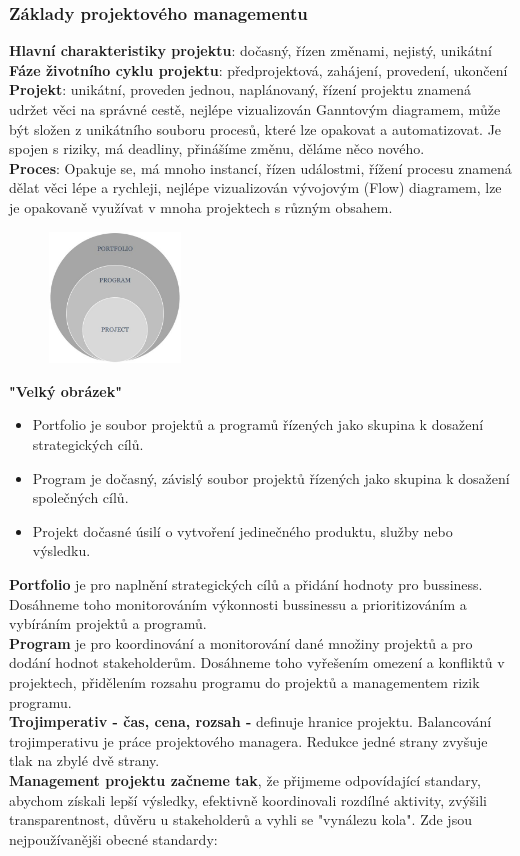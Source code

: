 \documentclass[11pt,a4paper]{article}
\begin{document}
    \subsubsection{Základy projektového managementu}
        \textbf{Hlavní charakteristiky projektu}: dočasný, řízen změnami, nejistý, unikátní\\
        \textbf{Fáze životního cyklu projektu}: předprojektová, zahájení, provedení, ukončení\\
        \textbf{Projekt}: unikátní, proveden jednou, naplánovaný, řízení projektu znamená udržet věci na správné cestě, nejlépe vizualizován Ganntovým diagramem, může být složen z unikátního souboru procesů, které lze opakovat a automatizovat. Je spojen s riziky, má deadliny, přinášíme změnu, děláme něco nového.\\
        \textbf{Proces}: Opakuje se, má mnoho instancí, řízen událostmi, řížení procesu znamená dělat věci lépe a rychleji, nejlépe vizualizován vývojovým (Flow) diagramem, lze je opakovaně využívat v mnoha projektech s různým obsahem.\\
        \begin{figure}
        \centering
        \includegraphics[width=3.5cm]{big_picture.jpg}
        \label{fig:bigpicture}
        \end{figure}
        \textbf{"Velký obrázek"}
        \begin{itemize}
            \item Portfolio je soubor projektů a programů řízených jako skupina k dosažení strategických cílů.
            \item Program je dočasný, závislý soubor projektů řízených jako skupina k dosažení společných cílů.
            \item Projekt dočasné úsilí o vytvoření jedinečného produktu, služby nebo výsledku.
        \end{itemize}
        \textbf{Portfolio} je pro naplnění strategických cílů a přidání hodnoty pro bussiness. Dosáhneme toho monitorováním výkonnosti bussinessu a prioritizováním a vybíráním projektů a programů.\\
        \textbf{Program} je pro koordinování a monitorování dané množiny projektů a pro dodání hodnot stakeholderům. Dosáhneme toho vyřešením omezení a konfliktů v projektech, přidělením rozsahu programu do projektů a managementem rizik programu.\\
        \textbf{Trojimperativ - čas, cena, rozsah -} definuje hranice projektu. Balancování trojimperativu je práce projektového managera. Redukce jedné strany zvyšuje tlak na zbylé dvě strany.\\
        \textbf{Management projektu začneme tak}, že přijmeme odpovídající standary, abychom získali lepší výsledky, efektivně koordinovali rozdílné aktivity, zvýšili transparentnost, důvěru u stakeholderů a vyhli se "vynálezu kola". Zde jsou nejpoužívanějši obecné standardy:
\end{document}
